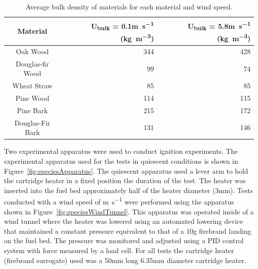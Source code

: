         \begin{table}[hpbt]
        \caption{Average bulk density of materials for each material and wind speed.}
        \centering
        \begin{tabular}{crr}
            Material & U\textsubscript{bulk} = 0.1\si{\meter\per\second} (\si{\kilogram\per\cubic\meter})& U\textsubscript{bulk} = 5.8\si{\meter\per\second} (\si{\kilogram\per\cubic\meter})\\
            \hline
            Oak Wood         & 344 & 428 \\
            Douglas-fir Wood & 99  & 74 \\
            Wheat Straw      & 85  & 85 \\
            Pine Wood        & 114 & 115 \\
            Pine Bark        & 215 & 172 \\
            Douglas-Fir Bark & 131 & 146  
        \end{tabular}
        \label{tab:density}
    \end{table}
    Two experimental apparatus were used to conduct ignition experiments. The experimental apparatus used for the tests in quiescent conditions is shown in Figure~\ref{fig:speciesApparatus}. The quiescent apparatus used a lever arm to hold the cartridge heater in a fixed position the duration of the test. The heater was inserted into the fuel bed approximately half of the heater diameter (3\si{\milli\meter}). Tests conducted with a wind speed of \si{\meter\per\second} were performed using the apparatus shown in Figure~\ref{fig:speciesWindTunnel}. This apparatus was operated inside of a wind tunnel where the heater was lowered using an automated lowering device that maintained a constant pressure equivalent to that of a 10\si{\gram} firebrand landing on the fuel bed. The pressure was monitored and adjusted using a PID control system with force measured by a load cell. For all tests the cartridge heater (firebrand surrogate) used was a 50\si{\milli\meter} long 6.35\si{\milli\meter} diameter cartridge heater.
